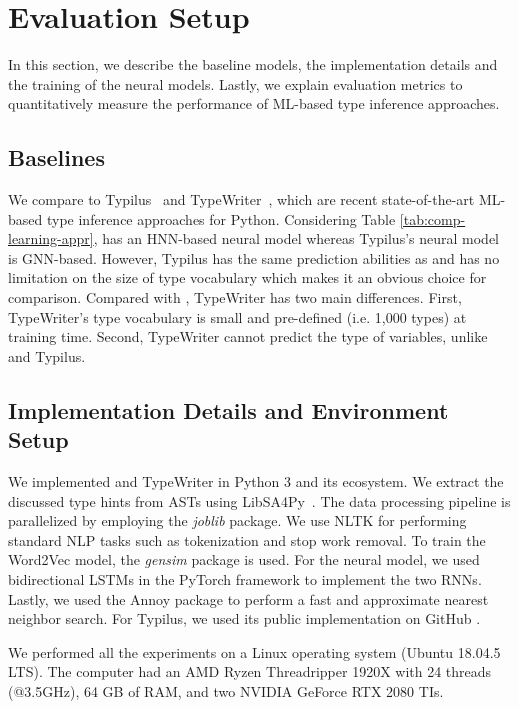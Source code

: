 \section{Evaluation Setup}\label{ch4:sec:es}
In this section, we describe the baseline models, the implementation details and the training of the neural models. Lastly, we explain evaluation metrics to quantitatively measure the performance of ML-based type inference approaches.

\subsection{Baselines}
We compare \name to Typilus~\cite{allamanis2020typilus} and TypeWriter~\cite{pradel2019typewriter}, which are recent state-of-the-art ML-based type inference approaches for Python. Considering Table \ref{tab:comp-learning-appr}, \name has an HNN-based neural model whereas Typilus's neural model is GNN-based. However, Typilus has the same prediction abilities as \name and has no limitation on the size of type vocabulary which makes it an obvious choice for comparison. Compared with \name, TypeWriter has two main differences. First, TypeWriter's type vocabulary is small and pre-defined (i.e. 1,000 types) at training time. Second, TypeWriter cannot predict the type of variables, unlike \name and Typilus.

\subsection{Implementation Details and Environment Setup}
\label{ch4:sub:implementation}
We implemented \name and TypeWriter in Python 3 and its ecosystem. We extract the discussed type hints from ASTs using LibSA4Py~\cite{libsa4py}. The data processing pipeline is parallelized by employing the \textit{joblib} package. We use NLTK \cite{loper2002nltk} for performing standard NLP tasks such as tokenization and stop work removal. To train the Word2Vec model, the \textit{gensim} package is used. For the neural model, we used bidirectional LSTMs \cite{schuster1997bidirectional} in the PyTorch framework \cite{paszke2019pytorch} to implement the two RNNs. Lastly, we used the Annoy\cite{annoy} package to perform a fast and approximate nearest neighbor search. For Typilus, we used its public implementation on GitHub \cite{typilus}.

We performed all the experiments on a Linux operating system (Ubuntu 18.04.5 LTS).
The computer had an AMD Ryzen Threadripper 1920X with 24 threads (@3.5GHz), 64 GB of RAM, and two NVIDIA GeForce RTX 2080 TIs.


